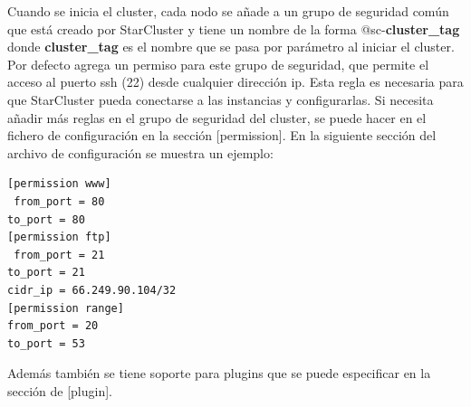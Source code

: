 \documentclass{article}
\begin{document}
	Cuando se inicia el cluster, cada nodo se añade a un grupo de seguridad común que está creado por StarCluster y tiene un nombre de la forma @sc-\textbf{cluster\_tag} donde \textbf{cluster\_tag} es el nombre que se pasa por parámetro al iniciar el cluster. Por defecto agrega un permiso para este grupo de seguridad, que permite el acceso al puerto ssh (22) desde cualquier dirección ip. Esta regla es necesaria para que StarCluster pueda conectarse a las instancias y configurarlas. Si necesita añadir más reglas en el grupo de seguridad del cluster, se puede hacer en el fichero de configuración en la sección [permission].  En la siguiente sección del archivo de configuración se muestra un ejemplo:
\begin{lstlisting}
[permission www]
 from_port = 80
to_port = 80
[permission ftp]
 from_port = 21
to_port = 21
cidr_ip = 66.249.90.104/32
[permission range]
from_port = 20
to_port = 53
\end{lstlisting}

	Además también se tiene soporte para plugins\cite{SystemPlugin} que se puede especificar en la sección de [plugin].
\end{document}
